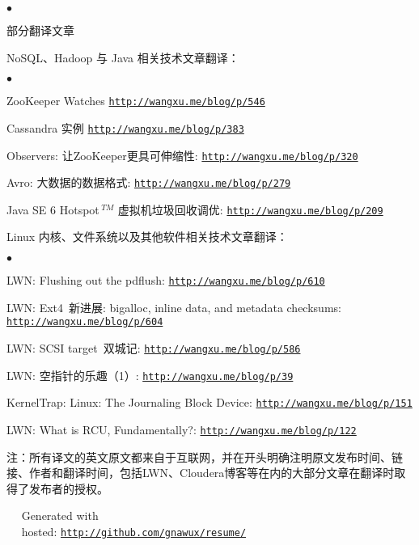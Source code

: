 \documentclass[margin,line]{res}
\newenvironment{list1}{
  \begin{list}{\ding{113}}{%
      \setlength{\itemsep}{0in}
      \setlength{\parsep}{0in} \setlength{\parskip}{0in}
      \setlength{\topsep}{0in} \setlength{\partopsep}{0in} 
      \setlength{\leftmargin}{0.17in}}}{\end{list}}
\newenvironment{list2}{
  \begin{list}{$\bullet$}{%
      \setlength{\itemsep}{0in}
      \setlength{\parsep}{0in} \setlength{\parskip}{0in}
      \setlength{\topsep}{0in} \setlength{\partopsep}{0in} 
      \setlength{\leftmargin}{0.2in}}}{\end{list}}
\newcommand{\http}{http:/\hspace{-0.3ex}/}
\newcommand{\hindent}{\mbox{\hspace{8ex}}}
\begin{document}
\begin{resume}
\begin{list1}
\begin{list2}
\vspace*{.05in}
\end{list2}
\end{list1}

\textsf{部分翻译文章}\\
\vspace*{-.1in}
\begin{list1}
\item[] NoSQL、Hadoop 与 Java 相关技术文章翻译：
\begin{list2}
\vspace*{.05in}
\item ZooKeeper Watches \href{http://wangxu.me/blog/p/546}{\tt\http{}wangxu.me/blog/p/546}
\item Cassandra 实例 \href{http://wangxu.me/blog/p/383}{\tt\http{}wangxu.me/blog/p/383}
\item Observers: 让ZooKeeper更具可伸缩性: \href{http://wangxu.me/blog/p/320}{\tt\http{}wangxu.me/blog/p/320}
\item Avro: 大数据的数据格式: \href{http://wangxu.me/blog/p/279}{\tt\http{}wangxu.me/blog/p/279}
\item Java SE 6 Hotspot${\,}^{TM}$ 虚拟机垃圾回收调优: \href{http://wangxu.me/blog/p/209}{\tt\http{}wangxu.me/blog/p/209}
\vspace*{.05in}
\end{list2}
\item[] Linux 内核、文件系统以及其他软件相关技术文章翻译：
\begin{list2}
\vspace*{.05in}
\item LWN: Flushing out the pdflush: \href{http://wangxu.me/blog/p/610}{\tt\http{}wangxu.me/blog/p/610}
\item LWN: Ext4~新进展: bigalloc, inline data, and metadata checksums: \\ \hindent \href{http://wangxu.me/blog/p/604}{\tt\http{}wangxu.me/blog/p/604}
\item LWN: SCSI target~双城记: \href{http://wangxu.me/blog/p/586}{\tt \http{}wangxu.me/blog/p/586}
\item LWN: 空指针的乐趣（1）: \href{http://wangxu.me/blog/p/39}{\tt\http{}wangxu.me/blog/p/39}
\item KernelTrap: Linux: The Journaling Block Device: \href{http://wangxu.me/blog/p/151}{\tt\http{}wangxu.me/blog/p/151}
\item LWN: What is RCU, Fundamentally?: \href{http://wangxu.me/blog/p/122}{\tt\http{}wangxu.me/blog/p/122}
\end{list2}
\end{list1}
{\small \textsf{注：所有译文的英文原文都来自于互联网，并在开头明确注明原文发布时间、链接、作者和翻译时间，包括LWN、Cloudera博客等在内的大部分文章在翻译时取得了发布者的授权。}}

\end{resume}

\vfill
\vfill
\mbox{ }\hspace{100pt}	\small\Resume\ Generated with \\
\mbox{ }\hspace{60pt}	\small\Resume\ hosted: \href{http://github.com/gnawux/resume/}{\tt\http{}github.com/gnawux/resume/}
\end{document}

